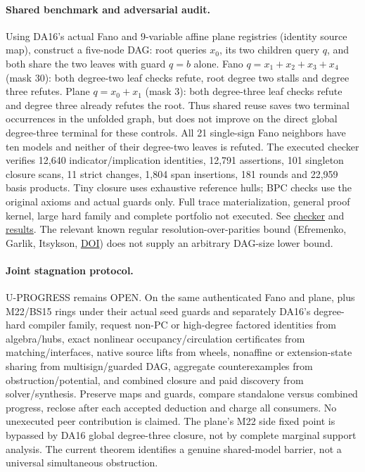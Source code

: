 \documentclass[11pt]{article}
\begin{document}
\paragraph{Shared benchmark and adversarial audit.}
Using DA16's actual Fano and $9$-variable affine plane registries (identity source map), construct a five-node DAG: root queries $x_0$, its two children query $q$, and both share the two leaves with guard $q=b$ alone. Fano $q=x_1+x_2+x_3+x_4$ (mask 30): both degree-two leaf checks refute, root degree two stalls and degree three refutes. Plane $q=x_0+x_1$ (mask 3): both degree-three leaf checks refute and degree three already refutes the root. Thus shared reuse saves two terminal occurrences in the unfolded graph, but does not improve on the direct global degree-three terminal for these controls. All 21 single-sign Fano neighbors have ten models and neither of their degree-two leaves is refuted. The executed checker verifies 12,640 indicator/implication identities, 12,791 assertions, 101 singleton closure scans, 11 strict changes, 1,804 span insertions, 181 rounds and 22,959 basis products. Tiny closure uses exhaustive reference hulls; BPC checks use the original axioms and actual guards only. Full trace materialization, general proof kernel, large hard family and complete portfolio not executed. See \href{https://github.com/j15marti/pnp/commit/ab4d54a0ed28fe9c781409ff797192fd835b8b60}{checker} and \href{https://github.com/j15marti/pnp/commit/95b0a9f9994f90acb06af2e7bf2db9b9ec28a689}{results}. The relevant known regular resolution-over-parities bound (Efremenko, Garlik, Itsykson, \href{https://doi.org/10.1137/24M1696640}{DOI}) does not supply an arbitrary DAG-size lower bound.

\paragraph{Joint stagnation protocol.}
U-PROGRESS remains OPEN. On the same authenticated Fano and plane, plus M22/BS15 rings under their actual seed guards and separately DA16's degree-hard compiler family, request non-PC or high-degree factored identities from algebra/hubs, exact nonlinear occupancy/circulation certificates from matching/interfaces, native source lifts from wheels, nonaffine or extension-state sharing from multisign/guarded DAG, aggregate counterexamples from obstruction/potential, and combined closure and paid discovery from solver/synthesis. Preserve maps and guards, compare standalone versus combined progress, reclose after each accepted deduction and charge all consumers. No unexecuted peer contribution is claimed. The plane's M22 side fixed point is bypassed by DA16 global degree-three closure, not by complete marginal support analysis. The current theorem identifies a genuine shared-model barrier, not a universal simultaneous obstruction.
\end{document}
